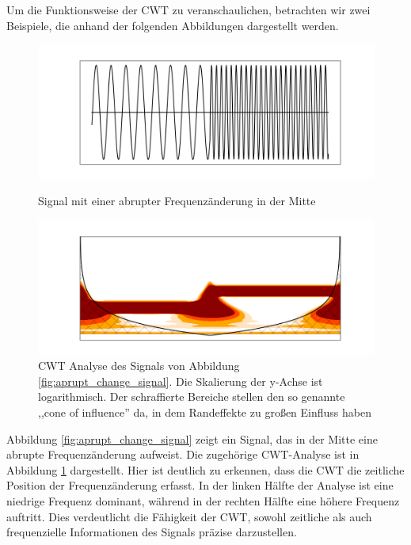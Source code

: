 Um die Funktionsweise der \ac{CWT} zu veranschaulichen, betrachten wir zwei Beispiele, die anhand der folgenden Abbildungen dargestellt werden.

 \begin{figure}[H]
     \centering
            \includegraphics[width=0.9\linewidth]{images/aprupt_change_signal.png}
            \caption{Signal mit einer abrupter Frequenzänderung in der Mitte}
            \label{fig:aprupt_change_signal}
            \includegraphics[width=0.9\linewidth]{images/aprupt_change_cwt.png}
            \caption[CWT Analyse eines Signals mit abrupter Frequenzänderung]{CWT Analyse des Signals von Abbildung \ref{fig:aprupt_change_signal}. Die Skalierung der y-Achse ist logarithmisch. Der schraffierte Bereiche stellen den so genannte ,,cone of influence'' da, in dem Randeffekte zu großen Einfluss haben} 
            \label{fig:aprupt_change_cwt}
\end{figure}

Abbildung \ref{fig:aprupt_change_signal} zeigt ein Signal, das in der Mitte eine abrupte Frequenzänderung aufweist. Die zugehörige \ac{CWT}-Analyse ist in Abbildung \ref{fig:aprupt_change_cwt} dargestellt. Hier ist deutlich zu erkennen, dass die \ac{CWT} die zeitliche Position der Frequenzänderung erfasst. In der linken Hälfte der Analyse ist eine niedrige Frequenz dominant, während in der rechten Hälfte eine höhere Frequenz auftritt. Dies verdeutlicht die Fähigkeit der \ac{CWT}, sowohl zeitliche als auch frequenzielle Informationen des Signals präzise darzustellen.

